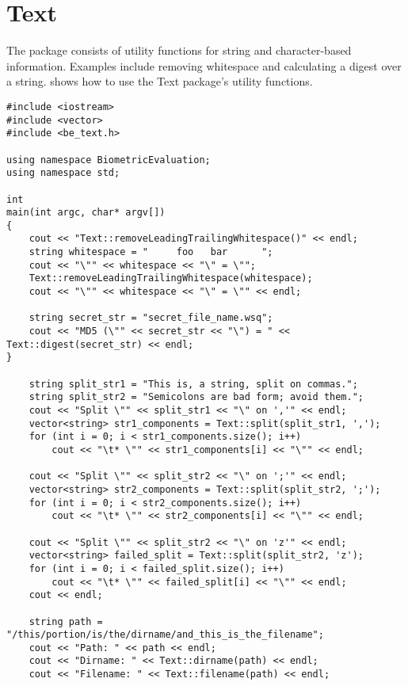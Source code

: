 %
%
\chapter{Text}
\label{chp-text}
The  package consists of utility functions for string and character-based
information. Examples include removing whitespace and calculating a digest over
a string.  shows how to use the Text package's utility
functions.

\begin{lstlisting}[caption={Using the \namespace{Text} Package}, label=textuse]
#include <iostream>
#include <vector>
#include <be_text.h>

using namespace BiometricEvaluation;
using namespace std;

int
main(int argc, char* argv[])
{
    cout << "Text::removeLeadingTrailingWhitespace()" << endl;
    string whitespace = "     foo   bar      ";
    cout << "\"" << whitespace << "\" = \"";
    Text::removeLeadingTrailingWhitespace(whitespace);
    cout << "\"" << whitespace << "\" = \"" << endl;

    string secret_str = "secret_file_name.wsq";
    cout << "MD5 (\"" << secret_str << "\") = " << Text::digest(secret_str) << endl;
}

    string split_str1 = "This is, a string, split on commas.";
    string split_str2 = "Semicolons are bad form; avoid them.";
    cout << "Split \"" << split_str1 << "\" on ','" << endl;
    vector<string> str1_components = Text::split(split_str1, ',');
    for (int i = 0; i < str1_components.size(); i++)
        cout << "\t* \"" << str1_components[i] << "\"" << endl;

    cout << "Split \"" << split_str2 << "\" on ';'" << endl;
    vector<string> str2_components = Text::split(split_str2, ';');
    for (int i = 0; i < str2_components.size(); i++)
        cout << "\t* \"" << str2_components[i] << "\"" << endl;

    cout << "Split \"" << split_str2 << "\" on 'z'" << endl;
    vector<string> failed_split = Text::split(split_str2, 'z');
    for (int i = 0; i < failed_split.size(); i++)
        cout << "\t* \"" << failed_split[i] << "\"" << endl;
    cout << endl;

    string path = "/this/portion/is/the/dirname/and_this_is_the_filename";
    cout << "Path: " << path << endl;
    cout << "Dirname: " << Text::dirname(path) << endl;
    cout << "Filename: " << Text::filename(path) << endl;

\end{lstlisting}


